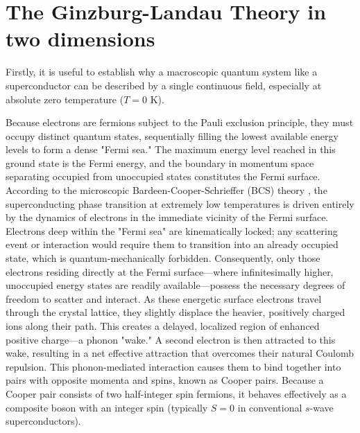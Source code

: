 \documentclass[english,binding=0.6cm,noexaminfo]{sapthesis}
\begin{document}
\section{The Ginzburg-Landau Theory in two dimensions}

Firstly, it is useful to establish why a macroscopic quantum system like a superconductor can be described by a single continuous field, especially at absolute zero temperature ($T=0$ K). 

Because electrons are fermions subject to the Pauli exclusion principle, they must occupy distinct quantum states, sequentially filling the lowest available energy levels to form a dense "Fermi sea." The maximum energy level reached in this ground state is the Fermi energy, and the boundary in momentum space separating occupied from unoccupied states constitutes the Fermi surface. According to the microscopic Bardeen-Cooper-Schrieffer (BCS) theory \cite{bardeen1957theory,cooper1956bound}, the superconducting phase transition at extremely low temperatures is driven entirely by the dynamics of electrons in the immediate vicinity of the Fermi surface. Electrons deep within the "Fermi sea" are kinematically locked; any scattering event or interaction would require them to transition into an already occupied state, which is quantum-mechanically forbidden. Consequently, only those electrons residing directly at the Fermi surface---where infinitesimally higher, unoccupied energy states are readily available---possess the necessary degrees of freedom to scatter and interact. As these energetic surface electrons travel through the crystal lattice, they slightly displace the heavier, positively charged ions along their path. This creates a delayed, localized region of enhanced positive charge---a phonon "wake." A second electron is then attracted to this wake, resulting in a net effective attraction that overcomes their natural Coulomb repulsion. This phonon-mediated interaction causes them to bind together into pairs with opposite momenta and spins, known as Cooper pairs. Because a Cooper pair consists of two half-integer spin fermions, it behaves effectively as a composite boson with an integer spin (typically $S=0$ in conventional $s$-wave superconductors).
\end{document}
